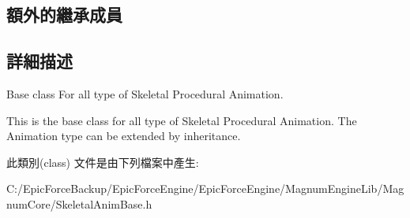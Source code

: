 \subsection*{額外的繼承成員}


\subsection{詳細描述}
Base class For all type of Skeletal Procedural Animation. 

This is the base class for all type of Skeletal Procedural Animation. The Animation type can be extended by inheritance. 

此類別(class) 文件是由下列檔案中產生\+:\begin{DoxyCompactItemize}
\item 
C\+:/\+Epic\+Force\+Backup/\+Epic\+Force\+Engine/\+Epic\+Force\+Engine/\+Magnum\+Engine\+Lib/\+Magnum\+Core/Skeletal\+Anim\+Base.\+h\end{DoxyCompactItemize}
